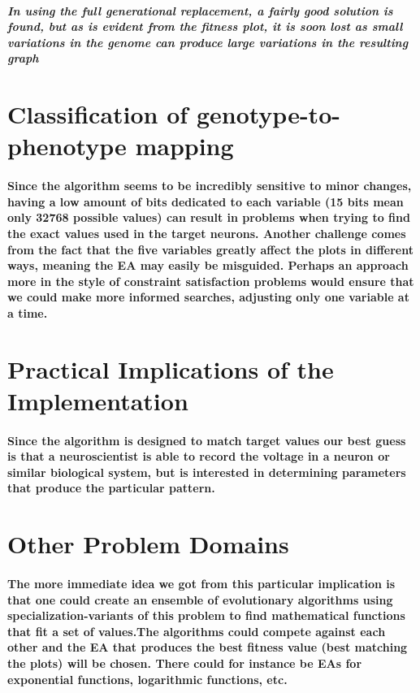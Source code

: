 \documentclass[titlepage,norsk]{article}
\begin{document}
\subparagraph{In using the full generational replacement, a fairly good solution is found, but as is evident from the fitness plot, it is soon lost as small variations in the genome can produce large variations in the resulting graph
}


\section{Classification of genotype-to-phenotype mapping}
\paragraph{Since the algorithm seems to be incredibly sensitive to minor changes, having a low amount of bits dedicated to each variable (15 bits mean only 32768 possible values) can result in problems when trying to find the exact values used in the target neurons.
Another challenge comes from the fact that the five variables greatly affect the plots in different ways, meaning the EA may easily be misguided. Perhaps an approach more in the style of constraint satisfaction problems would ensure that we could make more informed searches, adjusting only one variable at a time.}

\section{Practical Implications of the Implementation}
\paragraph{Since the algorithm is designed to match target values our best guess is that a neuroscientist is able to record the voltage in a neuron or similar biological system, but is interested in determining parameters that produce the particular pattern.}
\section{Other Problem Domains}

\paragraph{
The more immediate idea we got from this particular implication is that one could create an ensemble of evolutionary algorithms using specialization-variants of this problem to find mathematical functions that fit a set of values.The algorithms could compete against each other and the EA that produces the best fitness value (best matching the plots) will be chosen. There could for instance be EAs for exponential functions, logarithmic functions, etc.
}
\end{document}

